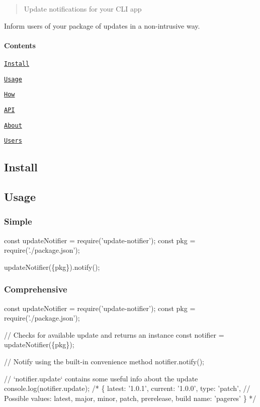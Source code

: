 \begin{quote}
Update notifications for your C\+LI app \end{quote}




Inform users of your package of updates in a non-\/intrusive way.

\paragraph*{Contents}


\begin{DoxyItemize}
\item \href{#install}{\tt Install}
\item \href{#usage}{\tt Usage}
\item \href{#how}{\tt How}
\item \href{#api}{\tt A\+PI}
\item \href{#about}{\tt About}
\item \href{#users}{\tt Users}
\end{DoxyItemize}

\subsection*{Install}




\subsection*{Usage}

\subsubsection*{Simple}


\begin{DoxyCode}
const updateNotifier = require('update-notifier');
const pkg = require('./package.json');

updateNotifier(\{pkg\}).notify();
\end{DoxyCode}


\subsubsection*{Comprehensive}


\begin{DoxyCode}
const updateNotifier = require('update-notifier');
const pkg = require('./package.json');

// Checks for available update and returns an instance
const notifier = updateNotifier(\{pkg\});

// Notify using the built-in convenience method
notifier.notify();

// `notifier.update` contains some useful info about the update
console.log(notifier.update);
/*
\{
  latest: '1.0.1',
  current: '1.0.0',
  type: 'patch', // Possible values: latest, major, minor, patch, prerelease, build
  name: 'pageres'
\}
*/
\end{DoxyCode}



